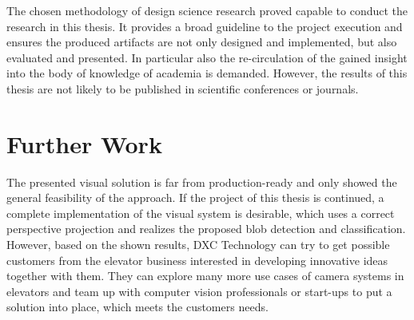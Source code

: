 The chosen methodology of design science research proved capable to 
conduct the research in this thesis.
It provides a broad guideline to the project execution 
and ensures the produced artifacts are not only designed and implemented, but also evaluated and presented.
In particular also the re-circulation of the gained insight into the body of knowledge of academia is demanded.
However, the results of this thesis are not likely to be published in scientific conferences or journals.

\section{Further Work}

The presented visual solution is far from production-ready and only showed the general feasibility of the approach.
If the project of this thesis is continued, a complete implementation of the visual system is desirable, which uses a correct perspective projection and realizes the proposed blob detection and classification.
However, based on the shown results, DXC Technology can try to get possible customers from the elevator business interested in developing innovative ideas together with them.
They can explore many more use cases of camera systems in elevators and team up with computer vision professionals or start-ups to put a solution into place, which meets the customers needs.
